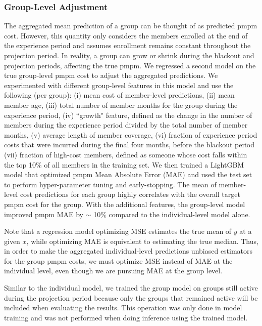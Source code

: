 \documentclass[letterpaper]{article} %
\begin{document}
\subsubsection{Group-Level Adjustment}
The aggregated mean prediction of a group can be thought of as predicted pmpm cost. However, this quantity only considers the 
members enrolled at the end of the experience period and assumes enrollment remains constant throughout the projection period. In reality, a group can grow or shrink during the blackout and projection periods, affecting the true pmpm. We regressed a second model on the true group-level pmpm cost to 
adjust the aggregated predictions. We experimented with different group-level features in this model and use the following (per group):
(i) mean cost of member-level predictions, (ii) mean member age, 
(iii) total number of member months for the group during the experience period, (iv) ``growth" feature, defined as the change in the number of members during the experience period divided by the total number of member months, (v) average length of member coverage,
(vi) fraction of experience period costs that were incurred during the final four months, before the blackout period (vii) fraction of high-cost members, defined as someone whose cost falls within the top 10\% of all members in the training set.
We then trained a LightGBM model that optimized pmpm Mean Absolute Error (MAE) and used the test set to perform hyper-parameter tuning and early-stopping. The mean of member-level cost predictions for each group highly correlates with the overall target pmpm cost for the group. With the additional features, the group-level model improved pmpm MAE by $\sim$ 10\% compared to the individual-level model alone.  

Note that a regression model optimizing MSE estimates the true mean of $y$ at a given $x$, while optimizing MAE is equivalent to estimating the true median. Thus, in order to make the aggregated individual-level predictions unbiased estimators for the group pmpm costs, we must optimize MSE instead of MAE at the individual level, even though we are pursuing MAE at the group level. 

Similar to the individual model, we trained the group model on groups still active during the projection period because only the groups that remained active will be included when evaluating the results. This operation was only done in model training and was not performed when doing inference using the trained model.
\end{document}
